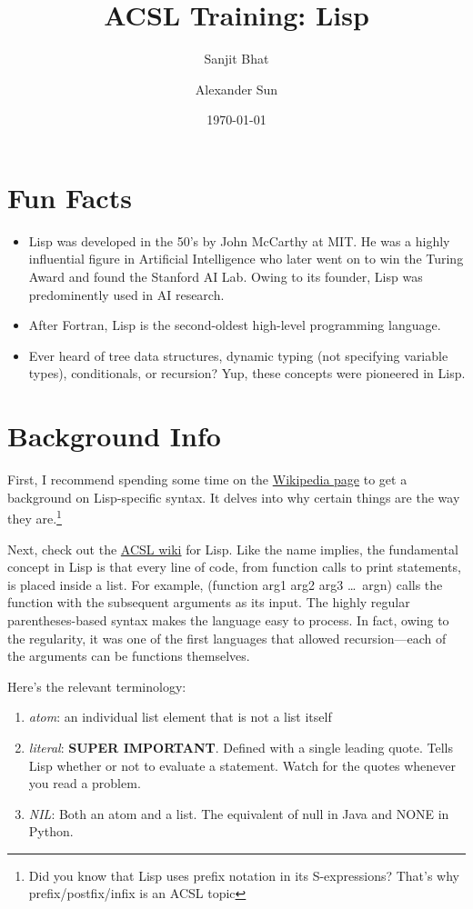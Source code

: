 \documentclass[11pt,letterpaper]{article}
\title{ACSL Training: Lisp}
\author{Sanjit Bhat \and Alexander Sun}
\date{\today}
\begin{document}
    \maketitle
    \section{Fun Facts}
    \begin{itemize}
        \item Lisp was developed in the 50's by John McCarthy at MIT.
        He was a highly influential figure in Artificial Intelligence who later
        went on to win the Turing Award and found the Stanford AI Lab.
        Owing to its founder, Lisp was predominently used in AI research.
        \item After Fortran, Lisp is the second-oldest high-level programming language.
        \item Ever heard of tree data structures, dynamic typing (not specifying variable types), conditionals, or recursion?
        Yup, these concepts were pioneered in Lisp.
    \end{itemize}

    \section{Background Info}
    First, I recommend spending some time on the
    \href{https://en.wikipedia.org/wiki/Lisp_(programming_language)#Syntax_and_semantics}{Wikipedia page} to get a background on Lisp-specific syntax.
    It delves into why certain things are the way they are.\footnote{Did
    you know that Lisp uses prefix notation in its S-expressions?
    That's why prefix/postfix/infix is an ACSL topic}

    Next, check out the \href{http://www.categories.acsl.org/wiki/index.php?title=LISP}{ACSL wiki} for Lisp.
    Like the name implies, the fundamental concept in Lisp is that every
    line of code, from function calls to print statements,
    is placed inside a list.
    For example, (function arg1 arg2 arg3 \ldots~argn)
    calls the function with the subsequent arguments as its input.
    The highly regular parentheses-based syntax makes the language
    easy to process.
    In fact, owing to the regularity, it was one of the first languages
    that allowed recursion---each of the arguments can be
    functions themselves.

    Here's the relevant terminology:
    \begin{enumerate}
        \item \textit{atom}: an individual list element that is not a list itself
        \item \textit{literal}: \textbf{SUPER IMPORTANT}.
        Defined with a single leading quote.
        Tells Lisp whether or not to evaluate a statement.
        Watch for the quotes whenever you read a problem.
        \item \textit{NIL}: Both an atom and a list.
        The equivalent of null in Java and NONE in Python.
    \end{enumerate}
\end{document}
